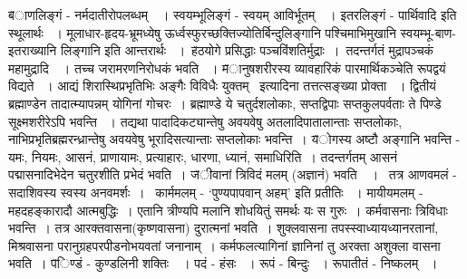 {\fontsize{14}{16}\selectfont \v  बाणलिङ्गं - नर्मदातीरोपलब्धम्~~। स्वयम्भूलिङ्गं - स्वयम् आविर्भूतम्~~। इतरलिङ्गं - पार्थिवादि इति स्थूलार्थः ~। मूलाधार-हृदय-भ्रूमध्येषु ऊर्ध्वस्फुरच्छक्तिज्योतिर्बिन्दुलिङ्गानि पश्चिमाभिमुखानि स्वयम्भू-बाण-इतराख्यानि लिङ्गानि इति आन्तरार्थः ~।}\footB \  
{\fontsize{14}{16}\selectfont \v  हठयोगे प्रसिद्धाः पञ्चविंशतिर्मुद्राः~।\footB \  तदन्तर्गतं मुद्रापञ्चकं महामुद्रादि~~। तच्च जरामरणनिरोधकं भवति ~। }
{\fontsize{14}{16}\selectfont \v  मानुषशरीरस्य व्यावहारिकं पारमार्थिकञ्चेति रूपद्वयं विद्यते ~। आद्यं शिरास्थिप्रभृतिभिः अङ्गैः विविधैः युक्तम् \footB \   इत्यादिना तत्तत्सङ्ख्या प्रोक्ता ~। द्वितीयं ब्रह्माण्डेन तादात्म्यापन्नम् योगिनां गोचरः~। ब्रह्माण्डे ये चतुर्दशलोकाः, सप्तद्विपाः सप्तकुलपर्वताः ते पिण्डे सूक्ष्मशरीरेऽपि भवन्ति ~। तद्यथा पादादिकट्यान्तेषु अवयवेषु अतलादिपातालान्ताः सप्तलोकाः, नाभिप्रभृतिब्रह्मरन्ध्रान्तेषु अवयवेषु  भूरादिसत्यान्ताः सप्तलोकाः भवन्ति~। }
{\fontsize{14}{16}\selectfont \v  योगस्य अष्टौ अङ्गानि भवन्ति - यमः, नियमः, आसनं, प्राणायामः, प्रत्याहारः, धारणा, ध्यानं, समाधिरिति~।  तदन्तर्गतम् आसनं पद्मासनादिभेदेन चतुरशीति प्रभेदं भवति~।}
{\fontsize{14}{16}\selectfont \v  जीवानां त्रिविदं मलम् (अज्ञानं) भवति~~।  \footB \  तत्र आणवमलं - सदाशिवस्य स्वस्य अनवमर्शः~।  \footB \  कार्ममलम् - ‘पुण्यपापवान् अहम्' इति प्रतीतिः ~। मायीयमलम् - महदहङ्कारादौ आत्मबुद्धिः~। एतानि त्रीण्यपि मलानि शोधयितुं समर्थः यः स गुरुः~।}
{\fontsize{14}{16}\selectfont \v  कर्मवासनाः त्रिविधाः भवन्ति~। तत्र आरक्तवासना(कृष्णवासना) दुरात्मनां भवति~। शुक्लवासना तपस्स्वाध्यायध्यानरतानां, मिश्रवासना परानुग्रहपरपीडनोभयवतां जनानाम्~। कर्मफलत्यागिनां ज्ञानिनां तु अरक्ता अशुक्ला वासना भवति~।}
{\fontsize{14}{16}\selectfont \v  पिण्डं - कुण्डलिनी शक्तिः~~। पदं - हंसः ~। रूपं - बिन्दुः ~। रूपातीतं - निष्कलम् ~।}
